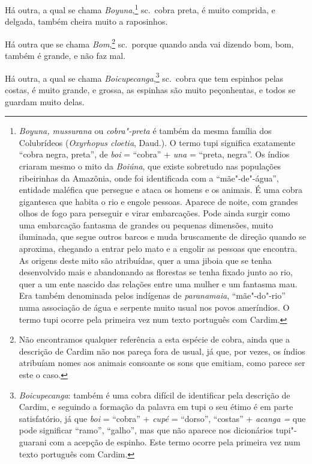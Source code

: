 \begin{linenumbers}
 Há outra, a qual se chama \textit{Boyuna},\footnote{ \textit{Boyuna,
mussurana} ou \textit{cobra"-preta} é também da mesma família dos
Colubrídeos (\textit{Oxyrhopus cloetia}, Daud.). O termo tupi significa
exatamente ``cobra negra, preta'', de \textit{boi} = ``cobra'' +
\textit{una} = ``preta, negra''. Os índios criaram mesmo o mito da
\textit{Boiúna}, que existe sobretudo nas populações ribeirinhas da
Amazônia, onde foi identificada com a ``mãe"-de"-água'', entidade maléfica
que persegue e ataca os homens e os animais. É uma cobra gigantesca que
habita o rio e engole pessoas. Aparece de noite, com grandes olhos de
fogo para perseguir e virar embarcações. Pode ainda surgir como uma
embarcação fantasma de grandes ou pequenas dimensões, muito iluminada,
que segue outros barcos e muda bruscamente de direção quando se
aproxima, chegando a entrar pelo mato e a engolir as pessoas que
encontra. As origens deste mito são atribuídas, quer a uma jiboia que
se tenha desenvolvido mais e abandonando as florestas se tenha fixado
junto ao rio, quer a um ente nascido das relações entre uma mulher e um
fantasma mau. Era também denominada pelos indígenas de
\textit{paranamaia}, ``mãe"-do"-rio'' numa associação de água e serpente
muito usual nos povos ameríndios. O termo tupi ocorre pela primeira vez
num texto português com Cardim.} sc.~cobra preta, é muito comprida, e
delgada, também cheira muito a raposinhos.

 Há outra que se chama \textit{Bom},\footnote{ Não encontramos qualquer
referência a esta espécie de cobra, ainda que a descrição de Cardim não
nos pareça fora de usual, já que, por vezes, os índios atribuíam nomes
aos animais consoante os sons que emitiam, como parece ser este o caso.}
sc.~porque quando anda vai dizendo bom, bom, também é grande, e não faz mal.

 Há outra, a qual se chama \textit{Boicupecanga},\footnote{ \textit{
Boicupecanga}: também é uma cobra difícil de identificar pela
descrição de Cardim, e seguindo a formação da palavra em tupi o seu
étimo é em parte satisfatório, já que \textit{boi} = ``cobra'' +
\textit{cupé} = ``dorso'', ``costas'' + \textit{acanga =} que pode
significar ``ramo'', ``galho'', mas que não aparece nos dicionários 
tupi"-guarani com a acepção de espinho. Este termo ocorre pela primeira
vez num texto português com Cardim.} sc.~cobra que tem espinhos pelas
costas, é muito grande, e grossa, as espinhas são muito peçonhentas, e
todos se guardam muito delas.


\end{linenumbers}
